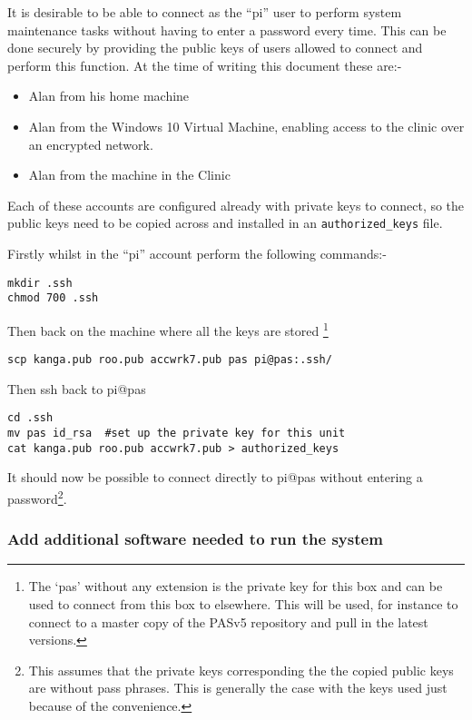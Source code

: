 \documentclass[Draft]{akc}
\begin{document}
It is desirable to be able to connect as the ``pi'' user to perform system maintenance tasks without having
to enter a password every time.  This can be done securely by providing the public keys of users
allowed to connect and perform this function. At the time of writing this document these are:-

\begin{itemize}
\item Alan from his home machine
\item Alan from the Windows 10 Virtual Machine, enabling access to the clinic over an encrypted network.
\item Alan from the machine in the Clinic
\end{itemize}

Each of these accounts are configured already with private keys to connect, so the public keys need to be copied
across and installed in an \texttt{authorized\_keys} file.

Firstly whilst in the ``pi'' account perform the following commands:-

\begin{lstlisting}
mkdir .ssh
chmod 700 .ssh
\end{lstlisting}

Then back on the machine where all the keys are stored \footnote{The `pas' without any extension is the private key for this box and can be used to connect from this box to elsewhere. This will be used, for instance to connect to a master copy of the PASv5 repository and pull in the latest versions.}

\begin{lstlisting}
scp kanga.pub roo.pub accwrk7.pub pas pi@pas:.ssh/
\end{lstlisting}

Then ssh back to pi@pas

\begin{lstlisting}
cd .ssh
mv pas id_rsa  #set up the private key for this unit
cat kanga.pub roo.pub accwrk7.pub > authorized_keys
\end{lstlisting}

It should now be possible to connect directly to pi@pas without entering a password\footnote{This
assumes that the private keys corresponding the the copied public keys are without pass phrases.
This is generally the case with the keys used just because of the convenience.}.

\subsubsection{Add additional software needed to run the system}
\end{document}
